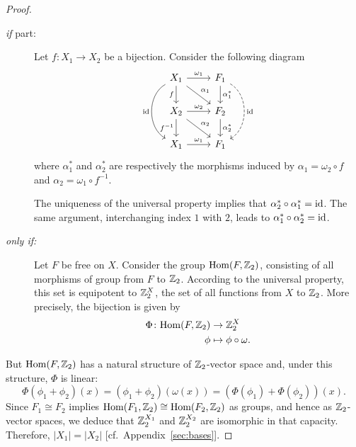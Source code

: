 \begin{proof}${}$
    \begin{description}
        \item[\rm{\it if\/} part:] Let $f\colon X_1\to X_2$ be a bijection. Consider the following diagram
        $$
            \begin{tikzcd}
                X_1
                        \arrow[r,"\omega_1"]
                        \arrow[d,"f"']
                        \arrow[rd,"\alpha_1"]
                        \arrow[dd,"\id"', bend right=60]
                    &F_1
                        \arrow[d,"\alpha_1^*"]
                        \arrow[dd,"\id",bend left=60,dashed]\\
                X_2
                        \arrow[r,"\omega_2"]
                        \arrow[d,"f^{-1}"']
                        \arrow[rd,"\alpha_2"]
                    &F_2
                        \arrow[d,"\alpha_2^*"]\\
                X_1
                        \arrow[r,"\omega_1"]
                    &F_1
            \end{tikzcd}
        $$
        where $\alpha_1^*$ and $\alpha_2^*$ are respectively the morphisms induced by $\alpha_1=\omega_2\circ f$ and $\alpha_2=\omega_1\circ f^{-1}$.

        The uniqueness of the universal property implies that $\alpha_2^*\circ\alpha_1^*=\operatorname{id}$. The same argument, interchanging index $1$ with $2$, leads to $\alpha_1^*\circ\alpha_2^*=\operatorname{id}$.

        \item[\it only if\rm:] Let $F$ be free on $X$. Consider the group ${\rm Hom}(F,\mathbb{Z}_2)$, consisting of all morphisms of group from $F$ to $\mathbb{Z}_2$. According to the universal property, this set is equipotent to $\mathbb{Z}_2^X$, the set of all functions from $X$ to $\mathbb{Z}_2$. More precisely, the bijection is given by
        \begin{align*}
            \Phi\colon{\rm Hom}(F,\mathbb{Z}_2)&\to\mathbb{Z}_2^X\\
            \phi&\mapsto\phi\circ\omega.
        \end{align*}
    \end{description}
    But ${\rm Hom}(F,\mathbb{Z}_2)$ has a natural structure of $\mathbb{Z}_2$-vector space and, under this structure, $\Phi$ is linear:
    $$
        \Phi(\phi_1+\phi_2)(x)=(\phi_1+\phi_2)(\omega(x))
            = (\Phi(\phi_1)+\Phi(\phi_2))(x).
    $$
    Since $F_1\cong F_2$ implies ${\rm Hom}(F_1,\mathbb{Z}_2)\cong{\rm Hom}(F_2,\mathbb{Z}_2)$ as groups, and hence as $\mathbb{Z}_2$-vector spaces, we deduce that $\mathbb{Z}_2^{X_1}$ and $\mathbb{Z}_2^{X_2}$ are isomorphic in that capacity. Therefore, $|X_1|=|X_2|$ [cf.~Appendix~\ref{sec:bases}].
\end{proof}

